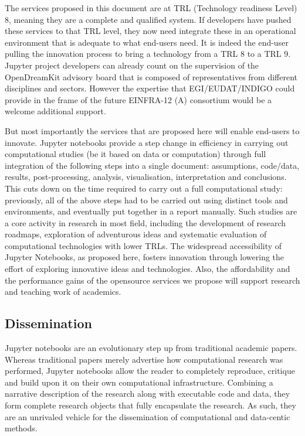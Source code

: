 The services proposed in this document are at TRL (Technology readiness Level) 8, meaning they are a complete and qualified system. If developers have pushed these services to that TRL level, they now need integrate these in an operational environment that is adequate to what end-users need. It is indeed the end-user pulling the innovation process to bring a technology from a TRL 8 to a TRL 9.
Jupyter project developers can already count on the supervision of the OpenDreamKit advisory board that is composed of representatives from different disciplines and sectors. However the expertise that EGI/EUDAT/INDIGO could provide in the frame of the future EINFRA-12 (A) consortium would be a welcome additional support.

But most importantly the services that are proposed here will enable
end-users to innovate. Jupyter notebooks provide a step change in efficiency in carrying out
computational studies (be it based on data or computation) through
full integration of the following steps into a single document:
assumptions, code/data, results, post-processing, analysis,
visualisation, interpretation and conclusions. This cuts down on the
time required to carry out a full computational study: previously, all
of the above steps had to be carried out using distinct tools and
environments, and eventually put together in a report manually. Such
studies are a core activity in research in most field, including the
development of research roadmaps, exploration of adventurous ideas and
systematic evaluation of computational technologies with lower
TRLs.
The widespread accessibility of Jupyter Notebooks, as proposed
here, fosters innovation through lowering the effort of exploring
innovative ideas and technologies. Also, the affordability and the performance gains
of the opensource services we propose will support research and teaching
work of academics.


\subsection{Dissemination}

Jupyter notebooks are an evolutionary step up from traditional
academic papers.  Whereas traditional papers merely advertise how
computational research was performed, Jupyter notebooks allow the
reader to completely reproduce, critique and build upon it on their
own computational infrastructure.  Combining a narrative description
of the research along with executable code and data, they form
complete research objects that fully encapsulate the research. As
such, they are an unrivaled vehicle for the dissemination of
computational and data-centic methods.

